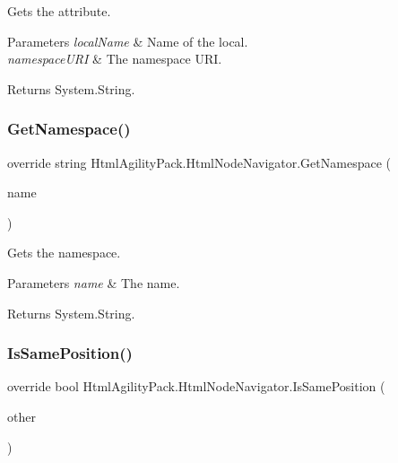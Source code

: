 Gets the attribute. 


\begin{DoxyParams}{Parameters}
{\em local\+Name} & Name of the local.\\
\hline
{\em namespace\+U\+RI} & The namespace U\+RI.\\
\hline
\end{DoxyParams}
\begin{DoxyReturn}{Returns}
System.\+String.
\end{DoxyReturn}
\mbox{\label{class_html_agility_pack_1_1_html_node_navigator_a2e194b0010b262a2de87f09c9fa78a80}} 
\subsubsection{\texorpdfstring{Get\+Namespace()}{GetNamespace()}}
{\footnotesize\ttfamily override string Html\+Agility\+Pack.\+Html\+Node\+Navigator.\+Get\+Namespace (\begin{DoxyParamCaption}\item[{string}]{name }\end{DoxyParamCaption})\hspace{0.3cm}{\ttfamily [inline]}}



Gets the namespace. 


\begin{DoxyParams}{Parameters}
{\em name} & The name.\\
\hline
\end{DoxyParams}
\begin{DoxyReturn}{Returns}
System.\+String.
\end{DoxyReturn}
\mbox{\label{class_html_agility_pack_1_1_html_node_navigator_af9f7339da8b725e833ef10c9a5668839}} 
\subsubsection{\texorpdfstring{Is\+Same\+Position()}{IsSamePosition()}}
{\footnotesize\ttfamily override bool Html\+Agility\+Pack.\+Html\+Node\+Navigator.\+Is\+Same\+Position (\begin{DoxyParamCaption}\item[{X\+Path\+Navigator}]{other }\end{DoxyParamCaption})\hspace{0.3cm}{\ttfamily [inline]}}



